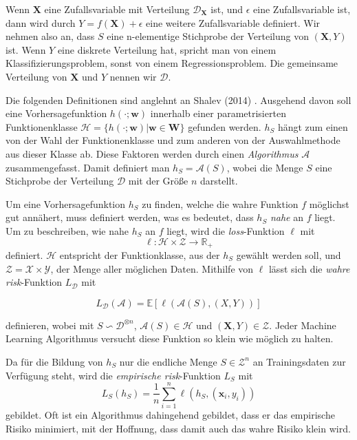 Wenn $\mathbf{X}$ eine Zufallsvariable mit Verteilung $\mathcal{D}_{\mathbf{X}}$ ist, und $\epsilon$ eine Zufallsvariable ist, dann wird durch
$Y = f(\mathbf{X}) + \epsilon$ eine weitere Zufallsvariable definiert. Wir nehmen also an, dass $S$ eine n-elementige Stichprobe der Verteilung
von $(\mathbf{X},Y)$ ist. Wenn $Y$ eine diskrete Verteilung hat, spricht man von einem Klassifizierungsproblem, sonst von einem Regressionsproblem.
Die gemeinsame Verteilung von $\mathbf{X}$ und $Y$ nennen wir $\mathcal{D}$.


Die folgenden Definitionen sind anglehnt an Shalev (2014) \cite[Seiten 33 bis 35]{shalev}.
Ausgehend davon soll eine Vorhersagefunktion $h(\cdot;\mathbf{w})$ innerhalb einer parametrisierten Funktionenklasse $\mathcal{H} = \{ h(\cdot; \mathbf{w})
	|\mathbf{w} \in \mathbf{W}\}$ gefunden werden. $h_S$ h\"angt zum einen von der Wahl der Funktionenklasse und zum anderen von der Auswahlmethode aus dieser Klasse ab.
Diese Faktoren werden durch einen \textit{Algorithmus} $\mathcal{A}$ zusammengefasst. Damit definiert man $h_S = \mathcal{A}(S)$, wobei die Menge $S$ eine
Stichprobe der Verteilung $\mathcal{D}$ mit der Gr\"o{\ss}e $n$ darstellt.


Um eine Vorhersagefunktion $h_S$ zu finden, welche die wahre Funktion $f$ m\"oglichst gut ann\"ahert, muss definiert werden, was es bedeutet, dass
$h_S$ \textit{nahe} an $f$ liegt. 
Um zu beschreiben, wie nahe $h_S$ an $f$ liegt, wird die \textit{loss}-Funktion $\ell$ mit
$$ \ell : \mathcal{H} \times \mathcal{Z} \to \mathbb{R}_+ $$
definiert. $\mathcal{H}$ entspricht der Funktionklasse, aus der $h_S$ gew\"ahlt werden soll, und $\mathcal{Z} =
	\mathcal{X} \times \mathcal{Y}$, der Menge aller m\"oglichen Daten. Mithilfe von $\ell$ l\"asst sich die \textit{wahre risk}-Funktion $L_{\mathcal{D}}$ mit

$$ L_{\mathcal{D}}(\mathcal{A}) = \mathbb{E}[\ell(\mathcal{A}(S), (X,Y))]$$

definieren, wobei mit $S \backsim \mathcal{D}^{\otimes n}$, $\mathcal{A}(S) \in \mathcal{H}$ und $(\mathbf{X},Y) \in \mathcal{Z}$. Jeder Machine Learning Algorithmus versucht diese Funktion so klein wie m\"oglich zu halten.


Da f\"ur die Bildung von $h_S$ nur die endliche Menge $S\in\mathcal{Z}^n$ an Trainingsdaten zur Verf\"ugung steht, wird die
\textit{empirische risk}-Funktion $L_S$ mit
$$ L_S(h_S) = \frac{1}{n}\sum_{i=1}^n \ell(h_S, (\mathbf{x}_i,y_i))$$
gebildet. Oft ist ein Algorithmus dahingehend gebildet, dass er das empirische Risiko minimiert, mit der Hoffnung, dass damit auch das wahre Risiko klein wird.


